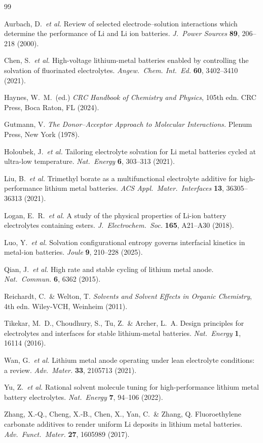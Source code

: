 \documentclass[11pt]{article}
\theoremstyle{plain}
\theoremstyle{definition}
\theoremstyle{remark}
\begin{document}
\begin{thebibliography}{99}

Aurbach, D.\ \textit{et al.}
Review of selected electrode--solution interactions which determine
the performance of Li and Li ion batteries.
\textit{J.\ Power Sources} \textbf{89}, 206--218 (2000).

Chen, S.\ \textit{et al.}
High-voltage lithium-metal batteries enabled by controlling the
solvation of fluorinated electrolytes.
\textit{Angew.\ Chem. Int.\ Ed.} \textbf{60}, 3402--3410 (2021).

Haynes, W.\ M.\ (ed.)
\textit{CRC Handbook of Chemistry and Physics}, 105th edn.
CRC Press, Boca Raton, FL (2024).

Gutmann, V.
\textit{The Donor--Acceptor Approach to Molecular Interactions.}
Plenum Press, New York (1978).

Holoubek, J.\ \textit{et al.}
Tailoring electrolyte solvation for Li metal batteries cycled at
ultra-low temperature.
\textit{Nat.\ Energy} \textbf{6}, 303--313 (2021).

Liu, B.\ \textit{et al.}
Trimethyl borate as a multifunctional electrolyte additive for
high-performance lithium metal batteries.
\textit{ACS Appl.\ Mater.\ Interfaces} \textbf{13}, 36305--36313 (2021).

Logan, E.\ R.\ \textit{et al.}
A study of the physical properties of Li-ion battery electrolytes
containing esters.
\textit{J.\ Electrochem.\ Soc.} \textbf{165}, A21--A30 (2018).

Luo, Y.\ \textit{et al.}
Solvation configurational entropy governs interfacial kinetics in
metal-ion batteries.
\textit{Joule} \textbf{9}, 210--228 (2025).

Qian, J.\ \textit{et al.}
High rate and stable cycling of lithium metal anode.
\textit{Nat.\ Commun.} \textbf{6}, 6362 (2015).

Reichardt, C.\ \& Welton, T.
\textit{Solvents and Solvent Effects in Organic Chemistry}, 4th edn.
Wiley-VCH, Weinheim (2011).

Tikekar, M.\ D., Choudhury, S., Tu, Z.\ \& Archer, L.\ A.
Design principles for electrolytes and interfaces for stable
lithium-metal batteries.
\textit{Nat.\ Energy} \textbf{1}, 16114 (2016).

Wan, G.\ \textit{et al.}
Lithium metal anode operating under lean electrolyte conditions:
a review.
\textit{Adv.\ Mater.} \textbf{33}, 2105713 (2021).

Yu, Z.\ \textit{et al.}
Rational solvent molecule tuning for high-performance lithium metal
battery electrolytes.
\textit{Nat.\ Energy} \textbf{7}, 94--106 (2022).

Zhang, X.-Q., Cheng, X.-B., Chen, X., Yan, C.\ \& Zhang, Q.
Fluoroethylene carbonate additives to render uniform Li deposits in
lithium metal batteries.
\textit{Adv.\ Funct.\ Mater.} \textbf{27}, 1605989 (2017).

\end{thebibliography}
\end{document}
